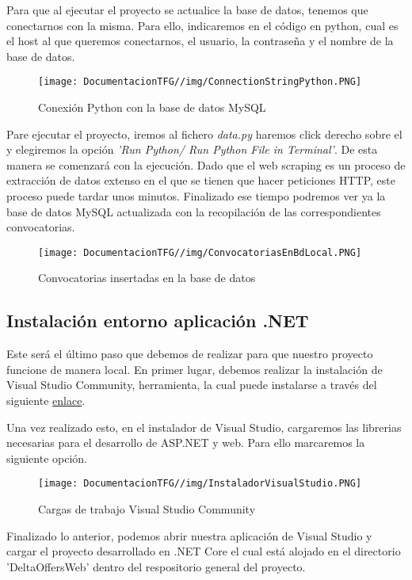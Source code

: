 Para que al ejecutar el proyecto se actualice la base de datos, tenemos que conectarnos con la misma. Para ello, indicaremos en el código en python, cual es el host al que queremos conectarnos, el usuario, la contraseña y el nombre de la base de datos.
\begin{figure}[H]
    \centering
    \texttt{[image: DocumentacionTFG//img/ConnectionStringPython.PNG]}
    \caption{Conexión Python con la base de datos MySQL}
    \label{fig:enter-label}
\end{figure}


Pare ejecutar el proyecto, iremos al fichero \textit{data.py} haremos click derecho sobre el y elegiremos la opción \textit{'Run Python/ Run Python File in Terminal'}. De esta manera se comenzará con la ejecución. Dado que el web scraping es un proceso de extracción de datos extenso en el que se tienen que hacer peticiones HTTP, este proceso puede tardar unos minutos. Finalizado ese tiempo podremos ver ya la base de datos MySQL actualizada con la recopilación de las correspondientes convocatorias.

\begin{figure}[H]
    \centering
    \texttt{[image: DocumentacionTFG//img/ConvocatoriasEnBdLocal.PNG]}
    \caption{Convocatorias insertadas en la base de datos}
\end{figure}

\subsection{Instalación entorno aplicación .NET}
Este será el último paso que debemos de realizar para que nuestro proyecto funcione de manera local. En primer lugar, debemos realizar la instalación de Visual Studio Community, herramienta, la cual puede instalarse a través del siguiente \href{https://visualstudio.microsoft.com/es/vs/community/}{enlace}.

Una vez realizado esto, en el instalador de Visual Studio, cargaremos las librerias necesarias para el desarrollo de ASP.NET y web. Para ello marcaremos la siguiente opción.
\begin{figure}[H]
    \centering
    \texttt{[image: DocumentacionTFG//img/InstaladorVisualStudio.PNG]}
    \caption{Cargas de trabajo Visual Studio Community}
\end{figure}

Finalizado lo anterior, podemos abrir nuestra aplicación de Visual Studio y cargar el proyecto desarrollado en .NET Core el cual está alojado en el directorio 'DeltaOffersWeb' dentro del respositorio general del proyecto.

